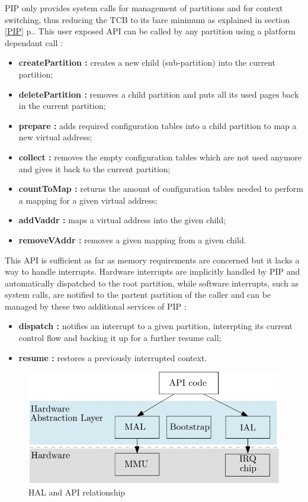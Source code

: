 \noindent PIP only provides system calls for management of partitions and for context switching, thus reducing the TCB to its bare minimum as explained in section \ref{PIP} p.\pageref{PIP}. This user exposed API can be called by any partition using a platform dependant call :
\begin{itemize}
	\item \textbf{createPartition :} creates a new child (sub-partition) into the current partition;
	\item \textbf{deletePartition :} removes a child partition and puts all its used pages back in the current partition;
	\item \textbf{prepare :} adds required configuration tables into a child partition to map a new virtual address;
	\item \textbf{collect :} removes the empty configuration tables which are not used anymore and gives it back to the current partition; 
	\item \textbf{countToMap :} returns the amount of configuration tables needed to perform a mapping for a given virtual address;
	\item \textbf{addVaddr :} maps a virtual address into the given child;
	\item \textbf{removeVAddr :} removes a given mapping from a given child.
\end{itemize} 
This API is sufficient as far as memory requirements are concerned but it lacks a way to handle interrupts. Hardware interrupts are implicitly handled by PIP and automatically dispatched to the root partition, while software interrupts, such as system calls, are notified to the partent partition of the caller and can be managed by these two additional services of PIP :
\begin{itemize}
	\item \textbf{dispatch :} notifies an interrupt to a given partition, interrpting its current control flow and backing it up for a further resume call;
	\item \textbf{resume :} restores a previously interrupted context.
\end{itemize} 

\begin{figure}[!ht]  
	\centering 	\includegraphics[width=0.8\linewidth,frame]{img/HAL.png} 
	\caption{HAL and API relationship}
	\label{HAL}
\end{figure}

